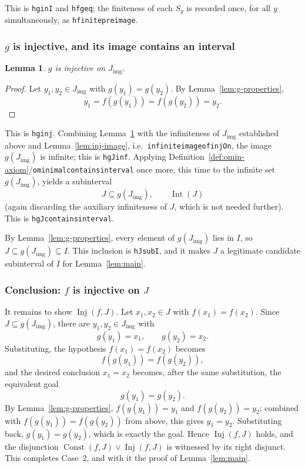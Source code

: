 \documentclass[11pt]{article}
\newtheorem{lemma}[definition]{Lemma}
\newcommand{\Lean}[1]{\texttt{\begingroup\def\_{\textunderscore\discretionary{}{}{}}#1\endgroup}}
\newcommand{\Const}{\operatorname{Const}}
\newcommand{\Inj}{\operatorname{Inj}}
\newcommand{\Int}{\operatorname{Int}}
\begin{document}
This is \Lean{h\_g\_in\_I} and \Lean{h\_fg\_eq}; the finiteness of each $S_y$ is recorded once, for
all $y$ simultaneously, as \Lean{h\_finite\_preimage}.
 
\subsubsection{$g$ is injective, and its image contains an interval}
 
\begin{lemma}\label{lem:g-injective}
$g$ is injective on $J_{\mathrm{img}}$.
\end{lemma}
 
\begin{proof}
Let $y_1,y_2\in J_{\mathrm{img}}$ with $g(y_1)=g(y_2)$. By Lemma~\ref{lem:g-properties},
\[
  y_1 = f(g(y_1)) = f(g(y_2)) = y_2.
\]
\end{proof}
 
This is \Lean{h\_g\_inj}. Combining Lemma~\ref{lem:g-injective} with the infiniteness of
$J_{\mathrm{img}}$ established above and Lemma~\ref{lem:inj-image}, i.e.\
\Lean{infinite\_image\_of\_injOn}, the image $g(J_{\mathrm{img}})$ is infinite; this is
\Lean{h\_gJ\_inf}. Applying
Definition~\ref{def:omin-axiom}/\Lean{o\_minimal\_contains\_interval} once more, this time to the
infinite set $g(J_{\mathrm{img}})$, yields a subinterval
\[
  J \subseteq g(J_{\mathrm{img}}), \qquad \Int(J)
\]
(again discarding the auxiliary infiniteness of $J$, which is not needed further). This is
\Lean{h\_gJ\_contains\_interval}.
 
By Lemma~\ref{lem:g-properties}, every element of $g(J_{\mathrm{img}})$ lies in $I$, so
$J\subseteq g(J_{\mathrm{img}})\subseteq I$. This inclusion is \Lean{hJ\_sub\_I}, and it makes $J$
a legitimate candidate subinterval of $I$ for Lemma~\ref{lem:main}.
 
\subsubsection{Conclusion: $f$ is injective on $J$}
 
It remains to show $\Inj(f,J)$. Let $x_1,x_2\in J$ with $f(x_1)=f(x_2)$. Since
$J\subseteq g(J_{\mathrm{img}})$, there are $y_1,y_2\in J_{\mathrm{img}}$ with
\[
  g(y_1)=x_1, \qquad g(y_2)=x_2.
\]
Substituting, the hypothesis $f(x_1)=f(x_2)$ becomes
\[
  f(g(y_1)) = f(g(y_2)),
\]
and the desired conclusion $x_1=x_2$ becomes, after the same substitution, the equivalent goal
\[
  g(y_1) = g(y_2).
\]
By Lemma~\ref{lem:g-properties}, $f(g(y_1))=y_1$ and $f(g(y_2))=y_2$; combined with
$f(g(y_1))=f(g(y_2))$ from above, this gives $y_1=y_2$. Substituting back, $g(y_1)=g(y_2)$, which
is exactly the goal. Hence $\Inj(f,J)$ holds, and the disjunction $\Const(f,J)\vee\Inj(f,J)$ is
witnessed by its right disjunct. This completes Case~2, and with it the proof of Lemma~\ref{lem:main}.
 
\end{document}
